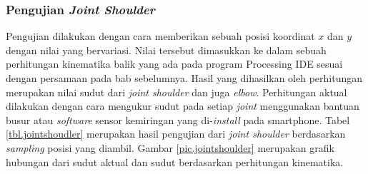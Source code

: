 \subsubsection{Pengujian \textit{Joint Shoulder}}
Pengujian dilakukan dengan cara memberikan sebuah posisi koordinat $x$ dan $y$ dengan nilai yang bervariasi. Nilai tersebut dimasukkan ke dalam sebuah perhitungan kinematika balik yang ada pada program Processing IDE sesuai dengan persamaan pada bab sebelumnya. Hasil yang dihasilkan oleh perhitungan merupakan nilai sudut dari \textit{joint shoulder} dan juga \textit{elbow}. Perhitungan aktual dilakukan dengan cara mengukur sudut pada setiap \textit{joint} menggunakan bantuan busur atau \textit{software} sensor kemiringan yang di-\textit{install} pada smartphone. Tabel \ref{tbl.jointshoudler} merupakan hasil pengujian dari \textit{joint shoulder} berdasarkan \textit{sampling} posisi yang diambil. Gambar \ref{pic.jointshoulder} merupakan grafik hubungan dari sudut aktual dan sudut berdasarkan perhitungan kinematika. 

